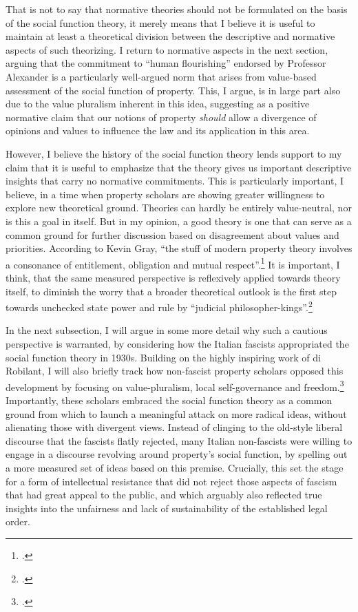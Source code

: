 That is not to say that normative theories should not be formulated on the basis of the social function theory, it merely means that I believe it is useful to maintain at least a theoretical division between the descriptive and normative aspects of such theorizing. I return to normative aspects in the next section, arguing that the commitment to ``human flourishing'' endorsed by Professor Alexander is a particularly well-argued norm that arises from value-based assessment of the social function of property. This, I argue, is in large part also due to the value pluralism inherent in this idea, suggesting as a positive normative claim that our notions of property {\it should} allow a divergence of opinions and values to influence the law and its application in this area.

However, I believe the history of the social function theory lends support to my claim that it is useful to emphasize that the theory gives us important descriptive insights that carry no normative commitments. This is particularly important, I believe, in a time when property scholars are showing greater willingness to explore new theoretical ground. Theories can hardly be entirely value-neutral, nor is this a goal in itself. But in my opinion, a good theory is one that can serve as a common ground for further discussion based on disagreement about values and priorities. According to Kevin Gray, ``the stuff of modern property theory involves a consonance of entitlement, obligation and mutual respect''.\footcite[37]{gray11} It is important, I think, that the same measured perspective is reflexively applied towards theory itself, to diminish the worry that a broader theoretical outlook is the first step towards unchecked state power and rule by ``judicial philosopher-kings''.\footcite[944]{claeys09}

In the next subsection, I will argue in some more detail why such a cautious perspective is warranted, by considering how the Italian fascists appropriated the social function theory in 1930s. Building on the highly inspiring work of di Robilant, I will also briefly track how non-fascist property scholars opposed this development by focusing on value-pluralism, local self-governance and freedom.\footcite{robilant13} Importantly, these scholars embraced the social function theory as a common ground from which to launch a meaningful attack on more radical ideas, without alienating those with divergent views. Instead of clinging to the old-style liberal discourse that the fascists flatly rejected, many Italian non-fascists were willing to engage in a discourse revolving around property's social function, by spelling out a more measured set of ideas based on this premise. Crucially, this set the stage for a form of intellectual resistance that did not reject those aspects of fascism that had great appeal to the public, and which arguably also reflected true insights into the unfairness and lack of sustainability of the established legal order.

